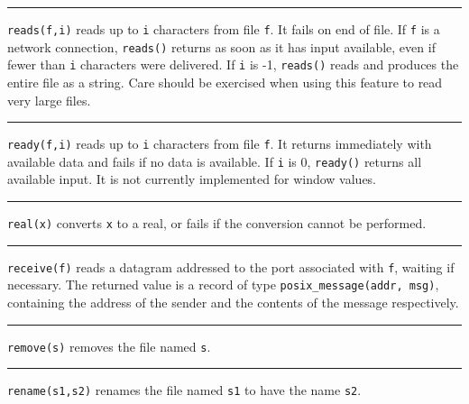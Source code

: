 \bigskip\hrule\vspace{0.1cm}

\noindent
{}\texttt{reads(f,i)} reads up to \texttt{i} characters
from file \texttt{f}. It fails on end of file. If \texttt{f} is a
network connection, \texttt{reads()} returns as soon as it has input
available, even if fewer than \texttt{i} characters were delivered. If
\texttt{i} is -1, \texttt{reads()} reads and produces the entire file
as a string. Care should be exercised when using this feature to read
very large files.

\bigskip\hrule\vspace{0.1cm}

\noindent
{}\texttt{ready(f,i)} reads up to \texttt{i} characters
from file \texttt{f}. It returns immediately with available data and
fails if no data is available. If \texttt{i} is 0, \texttt{ready()}
returns all available input. It is not currently implemented for window
values.

\bigskip\hrule\vspace{0.1cm}

\noindent
{}\texttt{real(x)} converts \texttt{x} to a real,
or fails if the conversion cannot be performed.

\bigskip\hrule\vspace{0.1cm}

\noindent
{}\texttt{receive(f)} reads a datagram addressed
to the port associated with \texttt{f}, waiting if necessary. The
returned value is a record of type \texttt{posix\_message(addr, msg)},
containing the address of the sender and the contents of the message
respectively. 

\bigskip\hrule\vspace{0.1cm}

\noindent
{}\texttt{remove(s)} removes the
file named \texttt{s}.

\bigskip\hrule\vspace{0.1cm}

\noindent
{}\texttt{rename(s1,s2)} renames the file named
\texttt{s1} to have the name \texttt{s2}.

